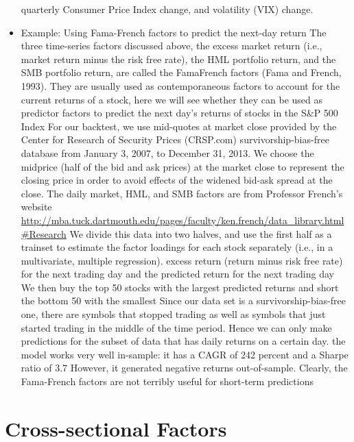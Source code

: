 \documentclass[11pt]{article}
\begin{document}
\begin{itemize}
                quarterly Consumer Price Index change, and volatility (VIX) change.
            \item Example: Using Fama-French factors to predict the next-day return
                \subitem The three time-series factors discussed above, the excess market return (i.e., market return minus the risk free rate), the HML portfolio return,
                and the SMB portfolio return, are called the FamaFrench factors (Fama and French, 1993).
                \subitem They are usually used as contemporaneous factors to account for the current returns of a stock, here we will see whether they can be used as predictor factors to predict the next
                day's returns of stocks in the S\&P 500 Index
                \subitem For our backtest, we use mid-quotes at market close provided by the Center for Research of Security Prices (CRSP.com) survivorship-bias-free database from January 3, 2007, to December 31, 2013.
                \subitem We choose the midprice (half of the bid and ask prices) at the market close to represent the closing price in order to avoid effects of the widened bid-ask spread at the close.
                \subitem The daily market, HML, and SMB factors are from Professor French's website \url{http://mba.tuck.dartmouth.edu/pages/faculty/ken.french/data_library.html#Research}
                \subitem We divide this data into two halves, and use the first half as a trainset to estimate the factor loadings for each stock separately (i.e., in a multivariate, multiple regression).
                \subitem excess return (return minus risk free rate) for the next trading day and the predicted return for the next trading day
                \subitem We then buy the top 50 stocks with the largest predicted returns and short the bottom 50 with the smallest
                \subitem Since our data set is a survivorship-bias-free one, there are symbols that stopped trading as well as symbols that just started trading in the middle of the time period. Hence we can only make
                predictions for the subset of data that has daily returns on a certain day.
                \subitem the model works very well in-sample: it has a CAGR of 242 percent and a Sharpe ratio of 3.7
                \subitem However, it generated negative returns out-of-sample. Clearly, the Fama-French factors are not terribly useful for short-term predictions
        \end{itemize}

    \section*{Cross-sectional Factors}
\end{document}

